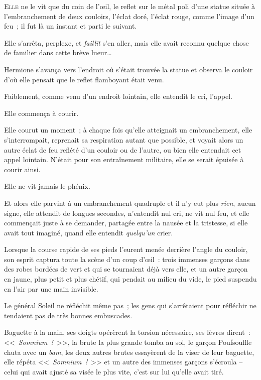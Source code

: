 
\lettrine{E}{lle} ne le vit que du coin de l'œil, le reflet sur le métal poli d'une statue située à l'embranchement de deux couloirs, l'éclat doré, l'éclat rouge, comme l'image d'un feu~; il fut là un instant et parti le suivant.

Elle s'arrêta, perplexe, et \emph{faillit} s'en aller, mais elle avait reconnu quelque chose de familier dans cette brève lueur…

Hermione s'avança vers l'endroit où s'était trouvée la statue et observa le couloir d'où elle pensait que le reflet flamboyant était venu.

Faiblement, comme venu d'un endroit lointain, elle entendit le cri, l'appel.

Elle commença à courir.

Elle courut un moment~; à chaque fois qu'elle atteignait un embranchement, elle s'interrompait, reprenait sa respiration autant que possible, et voyait alors un autre éclat de feu reflété d'un couloir ou de l'autre, ou bien elle entendait cet appel lointain. N'était pour son entraînement militaire, elle se serait épuisée à courir ainsi.

Elle ne vit jamais le phénix.

Et alors elle parvint à un embranchement quadruple et il n'y eut plus \emph{rien}, aucun signe, elle attendit de longues secondes, n'entendit nul cri, ne vit nul feu, et elle commençait juste à se demander, partagée entre la nausée et la tristesse, si elle avait tout imaginé, quand elle entendit \emph{quelqu'un} crier.

Lorsque la course rapide de ses pieds l'eurent menée derrière l'angle du couloir, son esprit captura toute la scène d'un coup d'œil~: trois immenses garçons dans des robes bordées de vert et qui se tournaient déjà vers elle, et un autre garçon en jaune, plus petit et plus chétif, qui pendait au milieu du vide, le pied suspendu en l'air par une main invisible.

Le général Soleil ne réfléchit même pas~; les gens qui s'arrêtaient pour réfléchir ne tendaient pas de très bonnes embuscades.

Baguette à la main, ses doigts opérèrent la torsion nécessaire, ses lèvres dirent~: <<~\emph{Somnium~!}~>>, la brute la plus grande tomba au sol, le garçon Poufsouffle chuta avec un \emph{bam}, les deux autres brutes essayèrent de la viser de leur baguette, elle répéta <<~\emph{Somnium~!}~>> et un autre des immenses garçons s'écroula -- celui qui avait ajusté sa visée le plus vite, c'est sur lui qu'elle avait tiré.

